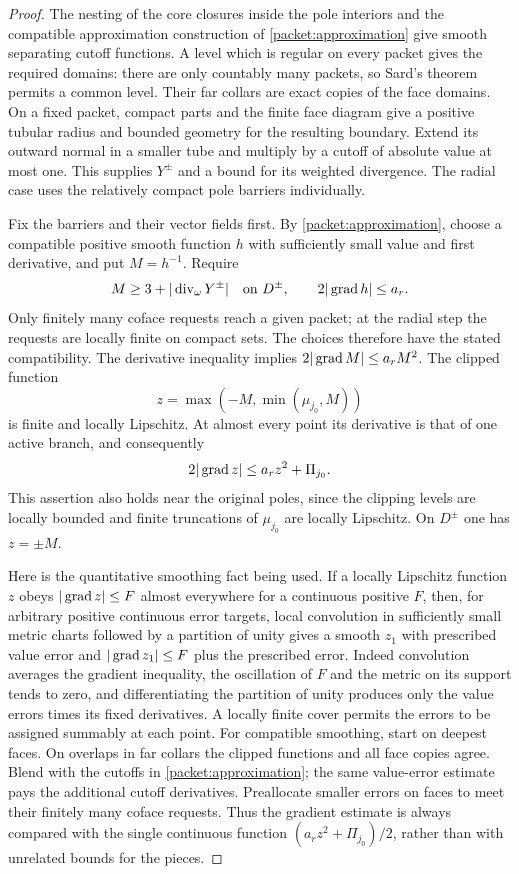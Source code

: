 \begin{proof}
The nesting of the core closures inside the pole interiors and the
compatible approximation construction of \cref{packet:approximation}
give smooth separating cutoff functions.  A level which is regular on
every packet gives the required domains: there are only countably many
packets, so Sard's theorem permits a common level.  Their far collars
are exact copies of the face domains.  On a fixed packet, compact parts
and the finite face diagram give a positive tubular radius and bounded
geometry for the resulting boundary.  Extend its outward normal in a
smaller tube and multiply by a cutoff of absolute value at most one.
This supplies $Y^\pm$ and a bound for its weighted divergence.  The radial
case uses the relatively compact pole barriers individually.

Fix the barriers and their vector fields first.  By
\cref{packet:approximation}, choose a compatible positive smooth function
$h$ with sufficiently small value and first derivative, and put $M=h^{-1}$.
Require
\[
 M\ge3+|\operatorname{div}_\omega Y^\pm|\quad\hbox{on }D^\pm,
 \qquad 2|\operatorname{grad} h|\le a_r.
\]
Only finitely many coface requests reach a given packet; at the radial
step the requests are locally finite on compact sets.  The choices
therefore have the stated compatibility.  The derivative inequality implies
$2|\operatorname{grad} M|\le a_rM^2$.  The clipped function
\[
                  z=\max(-M,\min(\mu_{j_0},M))
\]
is finite and locally Lipschitz.  At almost every point its derivative is
that of one active branch, and consequently
\[
                    2|\operatorname{grad} z|\le a_r z^2+\Pi_{j_0}.
\]
This assertion also holds near the original poles, since the clipping
levels are locally bounded and finite truncations of $\mu_{j_0}$ are
locally Lipschitz.  On $D^\pm$ one has $z=\pm M$.

Here is the quantitative smoothing fact being used.  If a locally
Lipschitz function $z$ obeys $|\operatorname{grad} z|\le F$ almost everywhere for a
continuous positive $F$, then, for arbitrary positive continuous error
targets, local convolution in sufficiently small metric charts followed
by a partition of unity gives a smooth $z_1$ with prescribed value error
and $|\operatorname{grad} z_1|\le F$ plus the prescribed error.  Indeed convolution
averages the gradient inequality, the oscillation of $F$ and the metric
on its support tends to zero, and differentiating the partition of unity
produces only the value errors times its fixed derivatives.  A locally
finite cover permits the errors to be assigned summably at each point.
For compatible smoothing, start on deepest faces.  On overlaps in far
collars the clipped functions and all face copies agree.  Blend with the
cutoffs in \cref{packet:approximation}; the same value-error estimate
pays the additional cutoff derivatives.  Preallocate smaller errors on
faces to meet their finitely many coface requests.  Thus the gradient
estimate is always compared with the single continuous function
$(a_rz^2+\Pi_{j_0})/2$, rather than with unrelated bounds for the pieces.


\end{proof}
